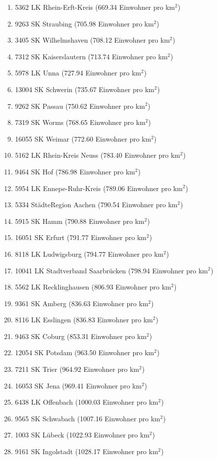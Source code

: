 \begin{enumerate}[itemsep=-6mm]
\item 5362 LK Rhein-Erft-Kreis (669.34 Einwohner pro km$^2$)
\item 9263 SK Straubing (705.98 Einwohner pro km$^2$)
\item 3405 SK Wilhelmshaven (708.12 Einwohner pro km$^2$)
\item 7312 SK Kaiserslautern (713.74 Einwohner pro km$^2$)
\item 5978 LK Unna (727.94 Einwohner pro km$^2$)
\item 13004 SK Schwerin (735.67 Einwohner pro km$^2$)
\item 9262 SK Passau (750.62 Einwohner pro km$^2$)
\item 7319 SK Worms (768.65 Einwohner pro km$^2$)
\item 16055 SK Weimar (772.60 Einwohner pro km$^2$)
\item 5162 LK Rhein-Kreis Neuss (783.40 Einwohner pro km$^2$)
\item 9464 SK Hof (786.98 Einwohner pro km$^2$)
\item 5954 LK Ennepe-Ruhr-Kreis (789.06 Einwohner pro km$^2$)
\item 5334 StädteRegion Aachen (790.54 Einwohner pro km$^2$)
\item 5915 SK Hamm (790.88 Einwohner pro km$^2$)
\item 16051 SK Erfurt (791.77 Einwohner pro km$^2$)
\item 8118 LK Ludwigsburg (794.77 Einwohner pro km$^2$)
\item 10041 LK Stadtverband Saarbrücken (798.94 Einwohner pro km$^2$)
\item 5562 LK Recklinghausen (806.93 Einwohner pro km$^2$)
\item 9361 SK Amberg (836.63 Einwohner pro km$^2$)
\item 8116 LK Esslingen (836.83 Einwohner pro km$^2$)
\item 9463 SK Coburg (853.31 Einwohner pro km$^2$)
\item 12054 SK Potsdam (963.50 Einwohner pro km$^2$)
\item 7211 SK Trier (964.92 Einwohner pro km$^2$)
\item 16053 SK Jena (969.41 Einwohner pro km$^2$)
\item 6438 LK Offenbach (1000.03 Einwohner pro km$^2$)
\item 9565 SK Schwabach (1007.16 Einwohner pro km$^2$)
\item 1003 SK Lübeck (1022.93 Einwohner pro km$^2$)
\item 9161 SK Ingolstadt (1028.17 Einwohner pro km$^2$)

\end{enumerate}
